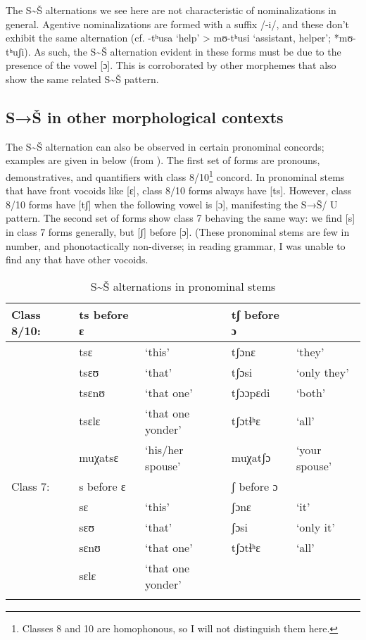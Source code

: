 The S{\textasciitilde}Š alternations we see here are not characteristic of nominalizations in general. Agentive nominalizations are formed with a suffix /-i/, and these don’t exhibit the same alternation (cf. -tʰusa ‘help’ > mʊ-tʰusi ‘assistant, helper’; *mʊ-tʰuʃi). As such, the S{\textasciitilde}Š alternation evident in these forms must be due to the presence of the vowel [ɔ]. This is corroborated by other morphemes that also show the same related S{\textasciitilde}Š pattern.

\subsection{S→Š in other morphological contexts}\label{sec:bennett:2.4}

The S{\textasciitilde}Š alternation can also be observed in certain pronominal concords; examples are given in  below (from \citealt{Cole1955}). The first set of forms are pronouns, demonstratives, and quantifiers with class 8/10\footnote{Classes 8 and 10 are homophonous, so I will not distinguish them here.} concord. In pronominal stems that have front vocoids like [ɛ], class 8/10 forms always have [ts]. However, class 8/10 forms have [tʃ] when the following vowel is [ɔ], manifesting the S→Š/ {\longrule} U pattern. The second set of forms show class 7 behaving the same way: we find [s] in class 7 forms generally, but [ʃ] before [ɔ]. (These pronominal stems are few in number, and phonotactically non-diverse; in reading  grammar, I was unable to find any that have other vocoids.

\vspace{.05in}
\begin{table}
\begin{tabularx}{\textwidth}{llQll}
\lsptoprule
Class 8/10: & ts before ɛ &  & tʃ before ɔ & \\
\midrule
& tsɛ & ‘this’ & tʃɔnɛ & ‘they’\\
& tsɛʊ & ‘that’ & tʃɔsi & ‘only they’\\
& tsɛnʊ & ‘that one’ & tʃɔɔpɛdi & ‘both’\\
& tsɛlɛ & ‘that one yonder’ & tʃɔtɬʰɛ & ‘all’\\
& muχatsɛ & ‘his/her spouse’ & muχatʃɔ & ‘your spouse’\\
\midrule
Class 7: & s before ɛ &  & ʃ before ɔ & \\
\midrule
& sɛ & ‘this’ & ʃɔnɛ & ‘it’\\
& sɛʊ & ‘that’ & ʃɔsi & ‘only it’\\
& sɛnʊ & ‘that one’ & tʃɔtɬʰɛ & ‘all’\\
& sɛlɛ & ‘that one yonder’ &  & \\
\lspbottomrule
\end{tabularx}
\caption{S{\textasciitilde}Š alternations in pronominal stems\label{tab:bennett:3}}
\end{table}

